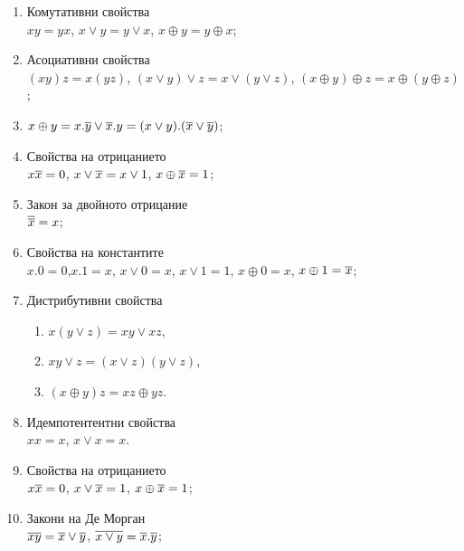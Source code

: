 
\begin{enumerate}[1)]%
\item
  Комутативни свойства\\
  $xy = yx$, $x\vee y = y\vee x$, $x\oplus y = y\oplus x$;
\item
  Асоциативни свойства\\
  $(xy)z = x(yz)$, $(x\vee y)\vee z = x\vee (y\vee z)$, $(x\oplus y)\oplus z = x\oplus (y\oplus z)$;
\item
  $x\oplus y = x.\overline{y}\vee \overline{x}.y = (x\vee y).(\overline{x}\vee\overline{y})$;
\item
  Свойства на отрицанието\\
  $x\overline{x} = 0$, $x\vee\overline{x} = x\vee 1$, $x\oplus\overline{x} = 1$;
\item
  Закон за двойното отрицание\\
  $\overline{\overline{x}} = x$;
\item
  Свойства на константите\\
  $x.0 = 0$,$x.1 = x$, $x\vee 0 = x$, $x\vee 1 = 1$, $x\oplus 0 = x$, $x\oplus 1 = \overline{x}$;
\item
  Дистрибутивни свойства
  \begin{enumerate}[]
  \item
    $x(y\vee z) = xy \vee xz$,
  \item
    $xy \vee z = (x\vee z)(y\vee z)$,
  \item
    $(x\oplus y)z = xz \oplus yz$.
  \end{enumerate}
\item
  Идемпотентентни свойства\\
  $xx = x$, $x\vee x = x$.
\item
  Свойства на отрицанието\\
  $x\overline{x} = 0$, $x\vee\overline{x} = 1$, $x\oplus\overline{x} = 1$;
\item
  Закони на Де Морган\\
  $\overline{xy} = \overline{x}\vee\overline{y}$, $\overline{x\vee y} = \overline{x}.\overline{y}$;
\end{enumerate}

